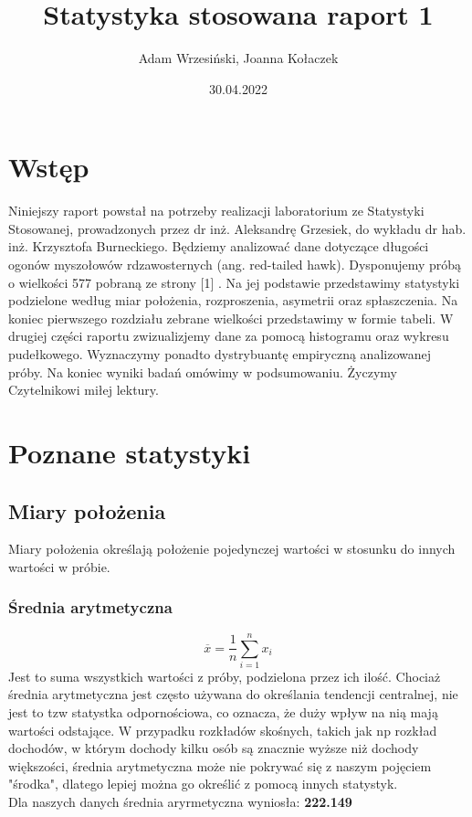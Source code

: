 \documentclass{article}
\title{Statystyka stosowana raport 1}
\author{Adam Wrzesiński, Joanna Kołaczek}
\date{30.04.2022}
\theoremstyle{break}
\begin{document}
	\maketitle
	\tableofcontents
	\clearpage
	\section{Wstęp}
	
	Niniejszy raport powstał na potrzeby realizacji laboratorium ze Statystyki Stosowanej, prowadzonych przez dr inż. Aleksandrę Grzesiek, do wykładu dr hab. inż. Krzysztofa Burneckiego. Będziemy analizować dane dotyczące długości ogonów myszołowów rdzawosternych (ang. red-tailed hawk). Dysponujemy próbą o wielkości 577 pobraną ze strony [1] . Na jej podstawie przedstawimy statystyki podzielone według miar położenia, rozproszenia, asymetrii oraz spłaszczenia. Na koniec pierwszego rozdziału zebrane wielkości przedstawimy w formie tabeli.  W drugiej części raportu zwizualizjemy dane za pomocą histogramu oraz wykresu pudełkowego. Wyznaczymy ponadto dystrybuantę empiryczną analizowanej próby. Na koniec wyniki badań omówimy w podsumowaniu. Życzymy Czytelnikowi miłej lektury.
	
	\section{Poznane statystyki}
	\subsection{Miary położenia}
	
	Miary położenia określają położenie pojedynczej wartości w stosunku do innych wartości w próbie. 
	
	\subsubsection*{Średnia arytmetyczna}
	$$\overline{x}=\frac{1}{n}\sum\limits_{i=1}^{n}x_i$$
	Jest to suma wszystkich wartości z próby, podzielona przez ich ilość. Chociaż średnia arytmetyczna jest często używana do określania tendencji centralnej, nie jest to tzw statystka odpornościowa, co oznacza, że duży wpływ na nią mają wartości odstające. W przypadku rozkładów skośnych, takich jak np rozkład dochodów, w którym dochody kilku osób są znacznie wyższe niż dochody większości, średnia arytmetyczna może nie pokrywać się z naszym pojęciem "środka", dlatego lepiej można go określić z pomocą innych statystyk.\\
	Dla naszych danych średnia aryrmetyczna wyniosła: \textbf{222.149}
\end{document}
